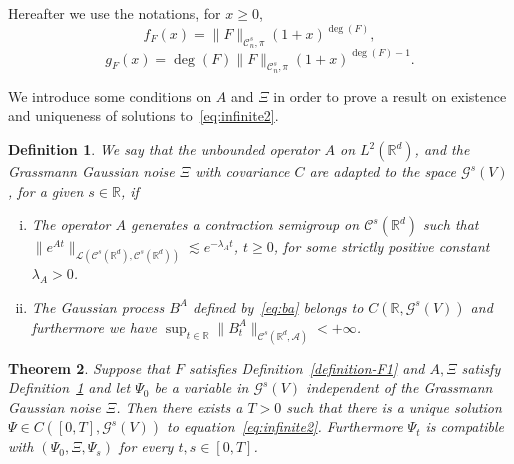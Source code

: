 \documentclass{article}
\newenvironment{enumerateroman}{\begin{enumerate}[i.] }{\end{enumerate}}
\newtheorem{theorem}{Theorem}
\newtheorem{definition}[theorem]{Definition}
\begin{document}
\begin{remark}
  \label{remark_drift} Hereafter we use the notations, for $x \geqslant 0$,
  \begin{equation}
    f_F (x) = \| F \|_{\mathcal{C}^s_n, \pi} (1 + x)^{\deg (F)},
  \end{equation}
  \begin{equation}
    g_F (x) = \deg (F) \| F \|_{\mathcal{C}^s_n, \pi} (1 + x)^{\deg (F) - 1} .
  \end{equation}
\end{remark}

We introduce some conditions on $A$ and $\Xi$ in order to prove a result on
existence and uniqueness of solutions to~{\eqref{eq:infinite2}}.

\begin{definition}
  \label{definition_infinitelinear}We say that the unbounded operator $A$ on
  $L^2 (\mathbb{R}^d)$, and the Grassmann Gaussian noise $\Xi$ with covariance
  $C$ are adapted to the space $\mathcal{G}^s (V)$, for a given $s \in
  \mathbb{R}$, if
  \begin{enumerateroman}
    \item The operator $A$ generates a contraction semigroup on $\mathcal{C}^s
    (\mathbb{R}^d)$ such that $\| e^{A t} \|_{\mathcal{L} (\mathcal{C}^s
    (\mathbb{R}^d), \mathcal{C}^s (\mathbb{R}^d))} \lesssim e^{- \lambda_A
    t}$, $t \geqslant 0$, for some strictly positive constant $\lambda_A > 0$.
    
    \item The Gaussian process $B^A$ defined by~{\eqref{eq:ba}} belongs to $C
    (\mathbb{R}, \mathcal{G}^s (V))$ and furthermore we have $\sup_{t \in
    \mathbb{R}} \| B_t^A \|_{\mathcal{C}^s (\mathbb{R}^d, \mathcal{A})} < +
    \infty$.
  \end{enumerateroman}
\end{definition}

\begin{theorem}
  \label{theorem_existence2}Suppose that $F$ satisfies
  Definition~\ref{definition-F1} and $A, \Xi$ satisfy
  Definition~\ref{definition_infinitelinear} and let $\Psi_0$ be a variable in
  $\mathcal{G}^s (V)$ independent of the Grassmann Gaussian noise $\Xi$. Then
  there exists a $T > 0$ such that there is a unique solution $\Psi \in C ([0,
  T], \mathcal{G}^s (V))$ to equation~{\eqref{eq:infinite2}}. Furthermore
  $\Psi_t$ is compatible with $(\Psi_0, \Xi, \Psi_s)$ for every $t, s \in [0,
  T]$.
\end{theorem}
\end{document}
